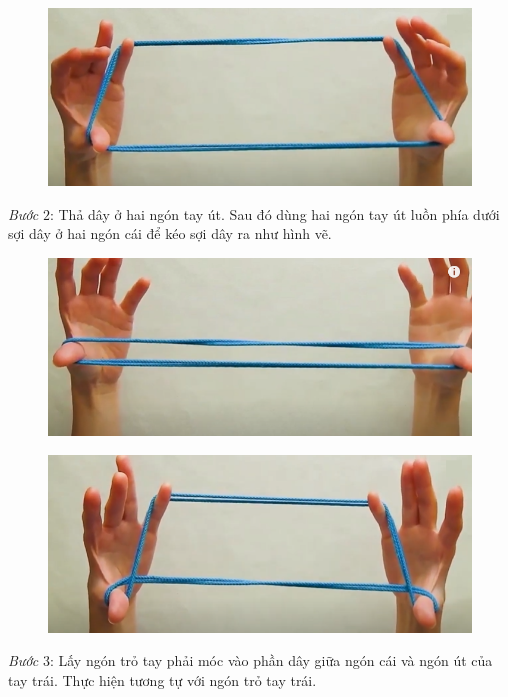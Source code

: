 \begin{multicols}{2}
\begin{figure}[H]
		\vspace*{1.5pt}
		\hspace*{3pt}\includegraphics[width=0.85\linewidth]{1c}
		\vspace*{-10pt}
	\end{figure}
	\textit{Bước} $2$: Thả dây ở hai ngón tay út. Sau đó dùng hai ngón tay út luồn phía dưới sợi dây ở hai ngón cái để kéo sợi dây ra như hình vẽ.
	\begin{figure}[H]
		\vspace*{-5pt}
		\centering
		\captionsetup{labelformat= empty, justification=centering}
		\includegraphics[width=0.85\linewidth]{2a}
	\end{figure}
	\begin{figure}[H]
		\vspace*{5pt}
		\centering
		\captionsetup{labelformat= empty, justification=centering}
		\includegraphics[width=0.85\linewidth]{2b}
		\vspace*{-5pt}
	\end{figure}
	\textit{Bước} $3$: Lấy ngón trỏ tay phải móc vào phần dây giữa ngón cái và ngón út của tay trái. Thực hiện tương tự với ngón trỏ tay trái.

\end{multicols}
